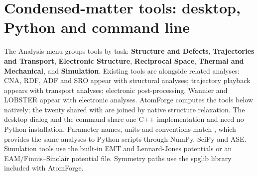 \section{Condensed-matter tools: desktop, Python and command line}
The Analysis menu groups tools by task: \textbf{Structure and Defects}, \textbf{Trajectories and Transport}, \textbf{Electronic Structure}, \textbf{Reciprocal Space}, \textbf{Thermal and Mechanical}, and \textbf{Simulation}. Existing tools are alongside related analyses: CNA, RDF, ADF and SRO appear with structural analyses; trajectory playback appears with transport analyses; electronic post-processing, Wannier and LOBSTER appear with electronic analyses. AtomForge computes the tools below natively; the twenty shared with  are joined by native structure relaxation. The desktop dialog and the  command share one C++ implementation and need no Python installation. Parameter names, units and conventions match , which provides the same analyses to Python scripts through NumPy, SciPy and ASE. Simulation tools use the built-in EMT and Lennard-Jones potentials or an EAM/Finnis--Sinclair potential file. Symmetry paths use the spglib library included with AtomForge.

